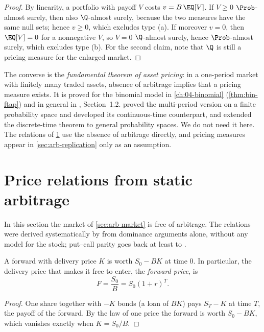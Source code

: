 \begin{proof}
By linearity, a portfolio with payoff $V$ costs $v=B\,\EQ[V]$. If $V\ge0$ $\Prob$-almost
surely, then also $\Q$-almost surely, because the two measures have the same null sets;
hence $v\ge0$, which excludes type (a). If moreover $v=0$, then $\EQ[V]=0$ for a
nonnegative $V$, so $V=0$ $\Q$-almost surely, hence $\Prob$-almost surely, which excludes
type (b). For the second claim, note that $\Q$ is still a pricing measure for the enlarged
market.
\end{proof}

The converse is the \emph{fundamental theorem of asset pricing}: in a one-period market with
finitely many traded assets, absence of arbitrage implies that a pricing measure exists. It
is proved for the binomial model in \cref{ch:04-binomial} (\cref{thm:bin-ftap}) and in
general in \textcite{follmer-schied}, Section~1.2. \textcite{harrison-pliska} proved the
multi-period version on a finite probability space and developed its continuous-time
counterpart, and \textcite{dalang-morton-willinger} extended the discrete-time theorem to
general probability spaces. We do not need it here. The relations of \cref{sec:arb-relations} use the
absence of arbitrage directly, and pricing measures appear in \cref{sec:arb-replication}
only as an assumption.

\section{Price relations from static arbitrage}\label{sec:arb-relations}

In this section the market of \cref{sec:arb-market} is free of arbitrage. The relations were
derived systematically by \textcite{merton1973} from dominance arguments alone, without any
model for the stock; put--call parity goes back at least to \textcite{stoll1969}.

\begin{proposition}\label{prop:arb-forward}
A forward with delivery price $K$ is worth $S_0-BK$ at time $0$. In particular, the delivery
price that makes it free to enter, the \emph{forward price}, is
\[
  F=\frac{S_0}{B}=S_0(1+r)^T .
\]
\end{proposition}

\begin{proof}
One share together with $-K$ bonds (a loan of $BK$) pays $S_T-K$ at time $T$, the payoff of
the forward. By the law of one price the forward is worth $S_0-BK$, which vanishes exactly
when $K=S_0/B$.
\end{proof}

